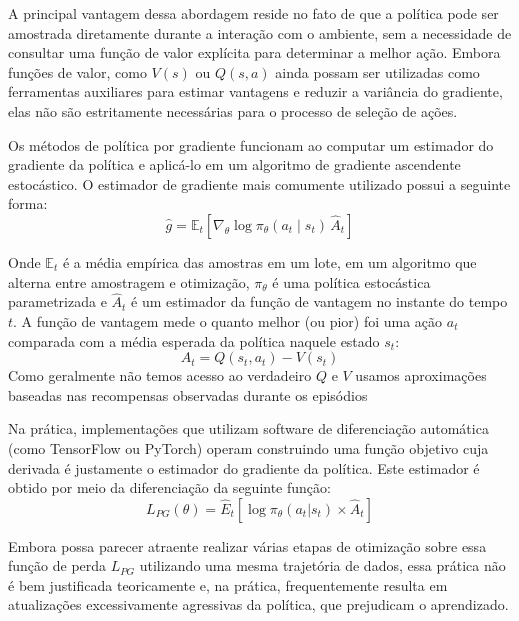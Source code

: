 A principal vantagem dessa abordagem reside no fato de que a política pode ser amostrada diretamente durante a interação 
com o ambiente, sem a necessidade de consultar uma função de valor explícita para determinar a melhor ação. 
Embora funções de valor, como \(V(s)\) ou \(Q(s,a)\) ainda possam ser utilizadas como ferramentas auxiliares
para estimar vantagens e reduzir a variância do gradiente, elas não são estritamente necessárias para o processo de seleção de ações.

Os métodos de política por gradiente funcionam ao computar um estimador do gradiente da política e aplicá-lo em 
um algoritmo de gradiente ascendente estocástico. O estimador de gradiente mais comumente utilizado possui a seguinte forma:
\begin{equation}
    \hat{g} = \mathbb{E}_{t} \left[ \nabla_{\theta} \log \pi_{\theta}(a_{t} \mid s_{t}) \, \hat{A}_{t} \right]  
\end{equation}

Onde \(\mathbb{E}_{t}\) é a média empírica das amostras em um lote, 
em um algoritmo que alterna entre amostragem e otimização, \(\pi_{\theta}\) é uma política estocástica parametrizada 
e \(\hat{A}_{t}\) é um estimador da função
de vantagem no instante do tempo \(t\). A função de vantagem mede o quanto melhor (ou pior) foi uma ação \(a_{t}\)
comparada com a média esperada da política naquele estado \(s_{t}\):
\begin{equation}
    A_{t} = Q(s_{t}, a_{t}) - V(s_{t})
\end{equation}
Como geralmente não temos acesso ao verdadeiro \(Q\) e \(V\)
usamos aproximações baseadas nas recompensas observadas durante os episódios

Na prática, implementações que utilizam software de diferenciação automática (como TensorFlow ou PyTorch) operam construindo uma 
função objetivo cuja derivada é justamente o estimador do gradiente da política. Este estimador é obtido por meio da diferenciação
da seguinte função:
\begin{equation}
    L_{PG}(\theta) = \hat{E}_{t} [ \log \pi_{\theta}(a_{t} | s_{t}) \times \hat{A}_t ]    
\end{equation}
  
Embora possa parecer atraente realizar várias etapas de otimização sobre essa função de perda \(L_{PG}\)
utilizando uma mesma trajetória de dados, essa prática não é bem justificada teoricamente e, na prática, 
frequentemente resulta em atualizações excessivamente agressivas da política, que prejudicam o aprendizado.


